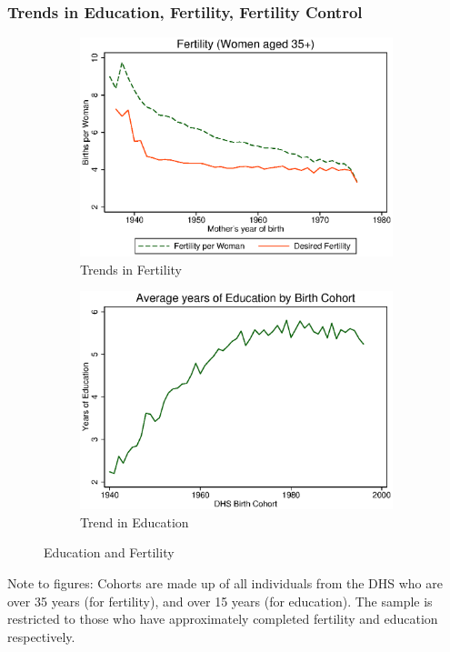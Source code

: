 \documentclass[10pt,letterpaper,subeqn]{beamer}
\begin{document}
\begin{frame}[label=Macro]
\frametitle{Trends in Education, Fertility, Fertility Control}
\begin{figure}[htpb!]
\centering
\begin{subfigure}{.5\textwidth}
  \centering
  \includegraphics[scale=0.39]{./figures/ferttrend_35_all.eps}
  \caption{Trends in Fertility}
  \label{TWINfig:fertrend}
\end{subfigure}%
\begin{subfigure}{.5\textwidth}
  \centering
  \includegraphics[scale=0.39]{./figures/eductrend_all.eps}
  \caption{Trend in Education}
  \label{TWINfig:eductrend}
\end{subfigure}
\caption{Education and Fertility}
\label{TWINfig:trends}
\end{figure}
\footnotesize{Note to figures: Cohorts are made up of all individuals 
from the DHS who are over 35 years (for fertility), and over 15 years (for education).  
The sample is restricted to those who have approximately completed fertility 
and education respectively.}
\end{frame}
\end{document}
